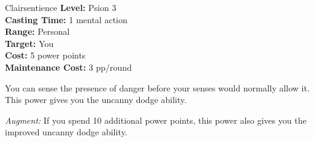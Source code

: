 {Clairsentience}
{
	\textbf{Level:}
	Psion 3\\
	\textbf{Casting Time:}
	1 mental action\\
	\textbf{Range:}
	Personal\\
	\textbf{Target:}
	You\\
	\textbf{Cost:}
	5 power points\\
	\textbf{Maintenance Cost:}
	3 pp/round\\
}
{
	You can sense the presence of danger before your senses would normally allow it. This power gives you the uncanny dodge ability.

	\textit{Augment:} If you spend 10 additional power points, this power also gives you the improved uncanny dodge ability.
}